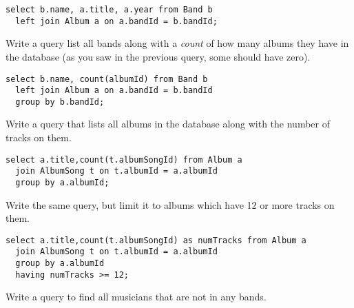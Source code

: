\documentclass[12pt]{exam}
\begin{document}
\begin{questions}
\begin{solution}

\begin{verbatim}
select b.name, a.title, a.year from Band b
  left join Album a on a.bandId = b.bandId;
\end{verbatim}
\end{solution}




\question Write a query list all bands along with a \emph{count} of how many
albums they have in the database (as you saw in the previous query, some should
have zero).

\begin{solution}

\begin{verbatim}
select b.name, count(albumId) from Band b
  left join Album a on a.bandId = b.bandId
  group by b.bandId;
\end{verbatim}
\end{solution}

\question Write a query that lists all albums in the database along with the
number of tracks on them.

\begin{solution}

\begin{verbatim}
select a.title,count(t.albumSongId) from Album a
  join AlbumSong t on t.albumId = a.albumId
  group by a.albumId;
\end{verbatim}
\end{solution}

\question Write the same query, but limit it to albums which have 12 or more 
tracks on them.

\begin{solution}

\begin{verbatim}
select a.title,count(t.albumSongId) as numTracks from Album a
  join AlbumSong t on t.albumId = a.albumId
  group by a.albumId
  having numTracks >= 12;
\end{verbatim}
\end{solution}


\question Write a query to find all musicians that are not in any bands.

\begin{solution}


\end{solution}
\end{questions}
\end{document}
